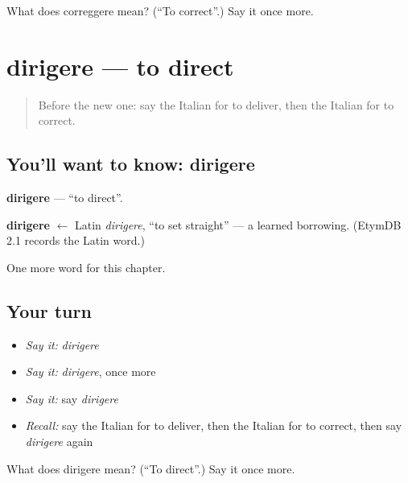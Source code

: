 \begin{tcolorbox}[breakable,colback=teal!4,colframe=teal!35!black,title={Before you move on}]
What does correggere mean? (\textquotedblleft{}To correct\textquotedblright{}.) Say it once more.
\end{tcolorbox}
\section[dirigere]{dirigere — to direct}

\label{lesson:IT-C241-dirigere}



\begin{quote}
Before the new one: say the Italian for to deliver, then the Italian for to correct.
\end{quote}

\subsection*{You'll want to know: dirigere}
\textbf{dirigere} — \textquotedblleft{}to direct\textquotedblright{}.

\begin{cousinweb}
\textbf{dirigere} $\leftarrow$ Latin \emph{dirigere}, \textquotedblleft{}to set straight\textquotedblright{} — a learned borrowing. (EtymDB 2.1 records the Latin word.)
\end{cousinweb}

\begin{grammarlens}[title={What you've built}]
One more word for this chapter.
\end{grammarlens}

\subsection*{Your turn}
\begin{itemize}
\raggedright
  \item \emph{Say it:} \emph{dirigere}
  \item \emph{Say it:} \emph{dirigere}, once more
  \item \emph{Say it:} say \emph{dirigere}
  \item \emph{Recall:} say the Italian for to deliver, then the Italian for to correct, then say \emph{dirigere} again
\end{itemize}

\begin{tcolorbox}[breakable,colback=teal!4,colframe=teal!35!black,title={Before you move on}]
What does dirigere mean? (\textquotedblleft{}To direct\textquotedblright{}.) Say it once more.
\end{tcolorbox}
